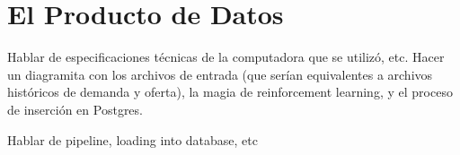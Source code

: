 \chapter{El Producto de Datos}

Hablar de especificaciones t\'ecnicas de la computadora que se utiliz\'o, etc. Hacer un diagramita con los archivos de entrada (que ser\'ian equivalentes a archivos hist\'oricos de demanda y oferta), la magia de reinforcement learning, y el proceso de inserci\'on en Postgres.


Hablar de pipeline, loading into database, etc





